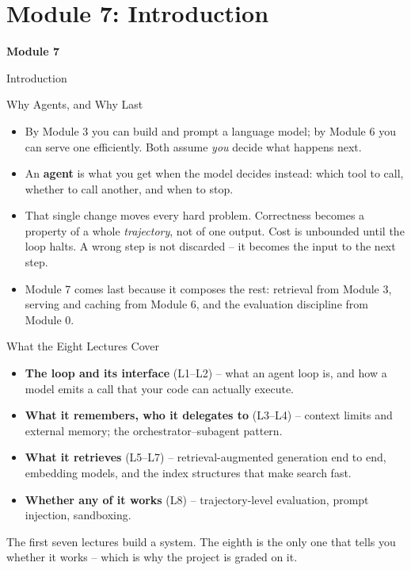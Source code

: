 \section{Module 7: Introduction}

\begin{frame}
\vfill
\centering
{\color{RLBlue}\Large\bfseries Module 7}

\vspace{0.6em}
{\Large Introduction}
\vfill
\end{frame}

\begin{frame}{Why Agents, and Why Last}
\begin{itemize}
  \item By Module 3 you can build and prompt a language model; by Module 6 you can serve one efficiently. Both assume \emph{you} decide what happens next.
  \pause
  \item An \textbf{agent} is what you get when the model decides instead: which tool to call, whether to call another, and when to stop.
  \pause
  \item That single change moves every hard problem. Correctness becomes a property of a whole \emph{trajectory}, not of one output. Cost is unbounded until the loop halts. A wrong step is not discarded -- it becomes the input to the next step.
  \pause
  \item Module 7 comes last because it composes the rest: retrieval from Module 3, serving and caching from Module 6, and the evaluation discipline from Module 0.
\end{itemize}
\end{frame}

\begin{frame}{What the Eight Lectures Cover}
\begin{itemize}
  \item \textbf{The loop and its interface} (L1--L2) -- what an agent loop is, and how a model emits a call that your code can actually execute.
  \pause
  \item \textbf{What it remembers, who it delegates to} (L3--L4) -- context limits and external memory; the orchestrator--subagent pattern.
  \pause
  \item \textbf{What it retrieves} (L5--L7) -- retrieval-augmented generation end to end, embedding models, and the index structures that make search fast.
  \pause
  \item \textbf{Whether any of it works} (L8) -- trajectory-level evaluation, prompt injection, sandboxing.
\end{itemize}
\pause
\begin{rlintuition}
The first seven lectures build a system. The eighth is the only one that tells you whether it works -- which is why the project is graded on it.
\end{rlintuition}
\end{frame}

